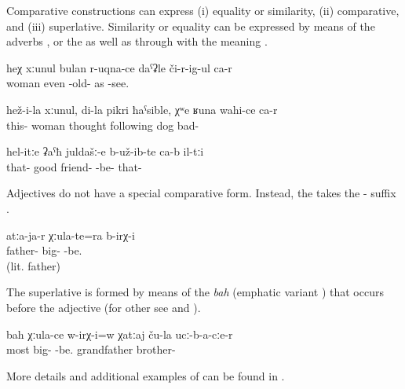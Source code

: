 Comparative constructions can express (i) equality or similarity, (ii) comparative, and (iii) superlative. Similarity or equality can be expressed by means of the adverbs   ,   or the    as well as through  with the meaning  .
%
\begin{exe}
	\ex	\label{ex:There is even a woman who looks old}
	\gll	heχ	xːunul	bulan	r-uqna-ce	daˁʡle	či-r-ig-ul ca-r \\
			woman	even	-old-	as	-see.  \\
	\glt	{}

	\ex	\label{ex:His wife, in my mind, is bad like a dog}
	\gll	hež-i-la	xːunul,	di-la	pikri	ħaˁsible, χʷe	ʁuna	wahi-ce	ca-r \\
		this-	woman		thought	following	dog		bad-	 \\
	\glt	{}

	\ex	\label{ex:They were such good friends}
	\gll	hel-itːe	ʡaˁħ	juldašː-e	b-už-ib-te ca-b	il-tːi \\
		that-	good	friend-	-be- 	that- \\
	\glt	{}
\end{exe}

Adjectives do not have a special comparative form. Instead, the  takes the - suffix . 
%
\begin{exe}
	\ex	\label{ex:There were (brothers) older than grandfather}
	\gll	atːa-ja-r	χːula-te=ra	b-irχ-i \\
		father- 	big-	-be. \\
	\glt	{} (lit. father)
\end{exe}

The superlative is formed by means of the  \textit{bah}  (emphatic variant ) that occurs before the adjective  (for other  see  and ).
%
\begin{exe}
	\ex	\label{ex:Was (our) grandfather the oldest among his brothers}
	\gll	bah	χːula-ce	w-irχ-i=w	χatːaj	ču-la	ucː-b-a-cːe-r \\
		most	big-	-be.	grandfather		brother- \\
	\glt	{}
\end{exe}

More details and additional examples of  can be found in .





